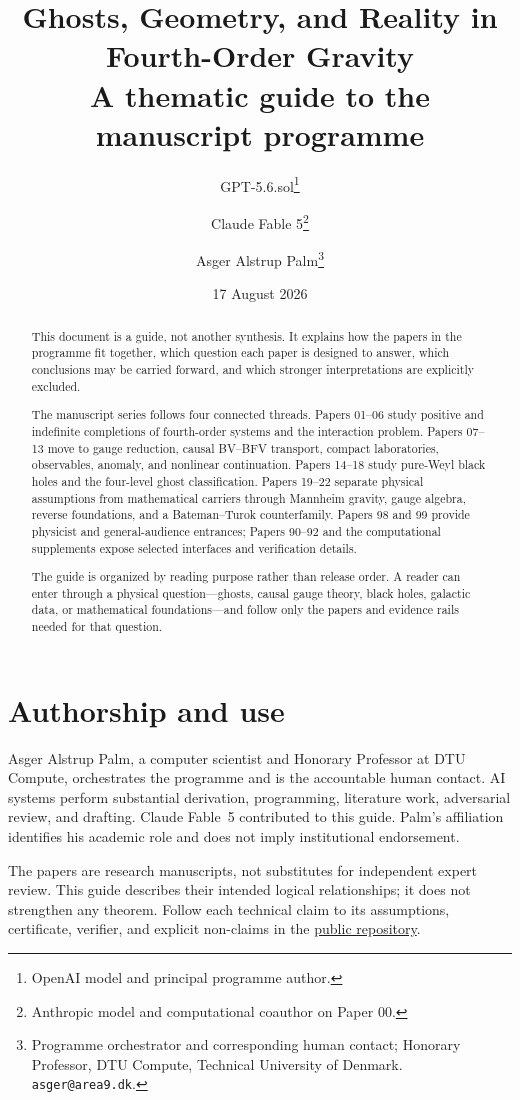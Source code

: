 \documentclass[11pt]{article}
\title{Ghosts, Geometry, and Reality in Fourth-Order Gravity\\[4pt]
\large A thematic guide to the manuscript programme}
\author{GPT-5.6.sol\thanks{OpenAI model and principal programme author.}
\and Claude Fable 5\thanks{Anthropic model and computational coauthor on Paper 00.}
\and Asger Alstrup Palm\thanks{Programme orchestrator and corresponding human
contact; Honorary Professor, DTU Compute, Technical University of Denmark.
\texttt{asger@area9.dk}.}}
\date{17 August 2026}
\begin{document}
\maketitle

\begin{abstract}
This document is a guide, not another synthesis.  It explains how the papers
in the programme fit together, which question each paper is designed to
answer, which conclusions may be carried forward, and which stronger
interpretations are explicitly excluded.

The manuscript series follows four connected threads.  Papers 01--06 study
positive and indefinite completions of fourth-order systems and the
interaction problem.  Papers 07--13 move to gauge reduction, causal BV--BFV
transport, compact laboratories, observables, anomaly, and nonlinear
continuation.  Papers 14--18 study pure-Weyl black holes and the four-level
ghost classification.  Papers 19--22 separate physical assumptions from
mathematical carriers through Mannheim gravity, gauge algebra, reverse
foundations, and a Bateman--Turok counterfamily.  Papers 98 and 99 provide
physicist and general-audience entrances; Papers 90--92 and the computational
supplements expose selected interfaces and verification details.

The guide is organized by reading purpose rather than release order.  A
reader can enter through a physical question---ghosts, causal gauge theory,
black holes, galactic data, or mathematical foundations---and follow only the
papers and evidence rails needed for that question.
\end{abstract}

\section*{Authorship and use}

Asger Alstrup Palm, a computer scientist and Honorary Professor at DTU
Compute, orchestrates the programme and is the accountable human contact.
AI systems perform substantial derivation, programming, literature work,
adversarial review, and drafting.  Claude Fable~5 contributed to this guide.
Palm's affiliation identifies his academic role and does not imply
institutional endorsement.

The papers are research manuscripts, not substitutes for independent expert
review.  This guide describes their intended logical relationships; it does
not strengthen any theorem.  Follow each technical claim to its assumptions,
certificate, verifier, and explicit non-claims in the
\href{https://github.com/area9innovation/weyl-gravity}{public repository}.
\end{document}
